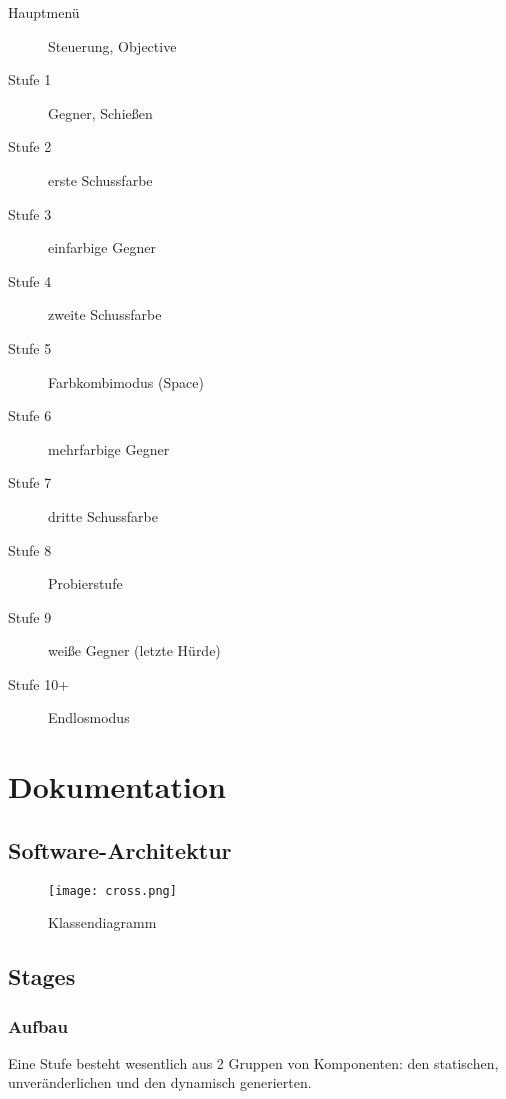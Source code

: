 \documentclass[a4paper,10pt,ngerman,fontsize=12pt]{scrreprt}
\begin{document}
\begin{description}
\item[Hauptmenü] Steuerung, Objective
\item[Stufe 1] Gegner, Schie{\ss}en
\item[Stufe 2] erste Schussfarbe
\item[Stufe 3] einfarbige Gegner
\item[Stufe 4] zweite Schussfarbe
\item[Stufe 5] Farbkombimodus (Space)
\item[Stufe 6] mehrfarbige Gegner
\item[Stufe 7] dritte Schussfarbe
\item[Stufe 8] Probierstufe
\item[Stufe 9] wei{\ss}e Gegner (letzte Hürde)
\item[Stufe 10+] Endlosmodus
\end{description}





\chapter{Dokumentation}




\section{Software-Architektur}

\lipsum[1]

\begin{figure}[h!]
\begin{center}
\texttt{[image: cross.png]}
\caption{Klassendiagramm}
\label{fig:classdiag}
\end{center}
\end{figure}
    



\section{Stages}
\label{sect:stages}


\subsection{Aufbau}

Eine Stufe besteht wesentlich aus 2 Gruppen von Komponenten: den statischen, unveränderlichen und den dynamisch generierten.
\end{document}
